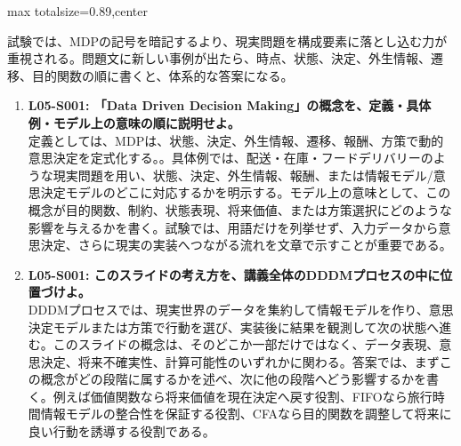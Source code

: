 \begin{minipage}[t]{0.58\textwidth}
\begin{adjustbox}{max totalsize={\textwidth}{0.89\textheight},center}
\begin{minipage}{\textwidth}
試験では、MDPの記号を暗記するより、現実問題を構成要素に落とし込む力が重視される。問題文に新しい事例が出たら、時点、状態、決定、外生情報、遷移、目的関数の順に書くと、体系的な答案になる。\par{}\begin{enumerate}\item \textbf{L05-S001: 「Data Driven Decision Making」の概念を、定義・具体例・モデル上の意味の順に説明せよ。}\\定義としては、MDPは、状態、決定、外生情報、遷移、報酬、方策で動的意思決定を定式化する。。具体例では、配送・在庫・フードデリバリーのような現実問題を用い、状態、決定、外生情報、報酬、または情報モデル/意思決定モデルのどこに対応するかを明示する。モデル上の意味として、この概念が目的関数、制約、状態表現、将来価値、または方策選択にどのような影響を与えるかを書く。試験では、用語だけを列挙せず、入力データから意思決定、さらに現実の実装へつながる流れを文章で示すことが重要である。\item \textbf{L05-S001: このスライドの考え方を、講義全体のDDDMプロセスの中に位置づけよ。}\\DDDMプロセスでは、現実世界のデータを集約して情報モデルを作り、意思決定モデルまたは方策で行動を選び、実装後に結果を観測して次の状態へ進む。このスライドの概念は、そのどこか一部だけではなく、データ表現、意思決定、将来不確実性、計算可能性のいずれかに関わる。答案では、まずこの概念がどの段階に属するかを述べ、次に他の段階へどう影響するかを書く。例えば価値関数なら将来価値を現在決定へ戻す役割、FIFOなら旅行時間情報モデルの整合性を保証する役割、CFAなら目的関数を調整して将来に良い行動を誘導する役割である。\end{enumerate}
\end{minipage}
\end{adjustbox}
\end{minipage}


